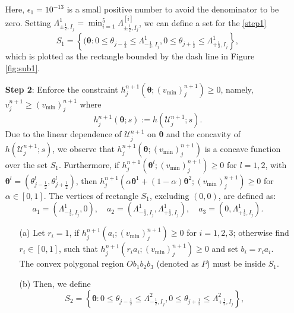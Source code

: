 \documentclass[times,final,11pt]{elsarticle}
\numberwithin{equation}{section}
\theoremstyle{definition}
\theoremstyle{remark}
\begin{document}
\begin{enumerate}[label=(\roman*),leftmargin=6mm]
	Here, $\epsilon_1 = 10^{-13}$ is a small positive number to avoid the denominator to be zero. Setting $\Lambda_{\pm \frac{1}{2}, I_j}^{1} = \min_{i = 1}^{5} \Lambda_{\pm \frac{1}{2}, I_j}^{[i]}$, we can define a set for the \eqref{step1}
	\begin{equation*}
	    S_1 = \left\{(\boldsymbol{\theta}: 0 \leq \theta_{j - \frac{1}{2}} \leq \Lambda_{- \frac{1}{2}, I_j}^1, 0 \leq \theta_{j + \frac{1}{2}} \leq \Lambda_{+ \frac{1}{2}, I_j}^1  \right\},
	\end{equation*}
	which is plotted as the rectangle bounded by the dash line in Figure \ref{fig:sub1}.
	
	\item[\textbf{Step 2}:]Enforce the constraint $h_{j}^{n + 1} (\boldsymbol{\theta}; (v_{\min})_j^{n + 1}) \geq 0$, namely, $v_j^{n + 1} \geq (v_{\min})_j^{n + 1}$ where
	\begin{equation*}
		 h_{ j}^{n + 1} (\boldsymbol{\theta}; s) := h (\boldsymbol{\mathcal{U}}_j^{n + 1}; s).
	\end{equation*}
	Due to the linear dependence of $\boldsymbol{\mathcal{U}}_j^{n + 1}$ on $\boldsymbol{\theta}$ and the concavity of $h (\boldsymbol{\mathcal{U}}_j^{n + 1}; s)$, we observe that $h_j^{n + 1}(\boldsymbol{\theta}; (v_{\min})_j^{n + 1})$ is a concave function over the set $S_1$. Furthermore, if $h_{j}^{n + 1}(\boldsymbol{\theta}^l; (v_{\min})_j^{n + 1}) \geq 0$ for $l = 1, 2$, with $\boldsymbol{\theta}^l = (\theta^l_{j - \frac{1}{2}}, \theta^l_{j + \frac{1}{2}})$, then $h_{j}^{n + 1}(\alpha \boldsymbol{\theta}^1 + (1 - \alpha) \boldsymbol{\theta}^2; (v_{\min})_j^{n + 1}) \geq 0$ for $\alpha \in [0, 1]$. The vertices of rectangle $S_1$, excluding $(0, 0)$, are defined as:
	\begin{equation*}
	    a_1 = (\Lambda_{- \frac{1}{2}, I_j}^1, 0), \quad a_2 = (\Lambda_{- \frac{1}{2}, I_j}^1, \Lambda_{+ \frac{1}{2}, I_j}^1), \quad a_3 = (0, \Lambda_{+ \frac{1}{2}, I_j}^1).
	\end{equation*}
	\begin{enumerate}
		\item[(a)] Let $r_i = 1$, if $h_{j}^{n + 1}(a_i; (v_{\min})_j^{n + 1}) \geq 0$ for $i = 1, 2, 3$; otherwise find $r_i \in [0, 1]$, such that $h_{j}^{n + 1}(r_i a_i; (v_{\min})_j^{n + 1}) \geq 0$ and set $b_i = r_i a_i$. The convex polygonal region $Ob_1b_2b_3$ (denoted as $P$) must be inside $S_1$.
		\item[(b)] Then, we define 
		\begin{equation*}
		    S_2 = \left\{\boldsymbol{\theta}: 0 \leq \theta_{j - \frac{1}{2}} \leq \Lambda_{- \frac{1}{2}, I_j}^2, 0 \leq \theta_{j + \frac{1}{2}} \leq \Lambda_{+ \frac{1}{2}, I_j}^2  \right\},

\end{equation*}
\end{enumerate}
\end{enumerate}
\end{document}
